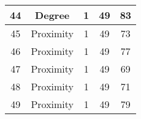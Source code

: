 \documentclass[results.tex]{subfiles}
\begin{document}
\begin{center}
\begin{tabular}{| c || c | c | c | c |}
            \hline
            44                      & Degree                       & 1                      & 49                      & 83                   \\
            \hline
            45                      & Proximity                    & 1                      & 49                      & 73                   \\
            \hline
            46                      & Proximity                    & 1                      & 49                      & 77                   \\
            \hline
            47                      & Proximity                    & 1                      & 49                      & 69                   \\
            \hline
            48                      & Proximity                    & 1                      & 49                      & 71                   \\
            \hline
            49                      & Proximity                    & 1                      & 49                      & 79                   \\
            \hline
        \end{tabular}
    \end{center}
\end{document}
